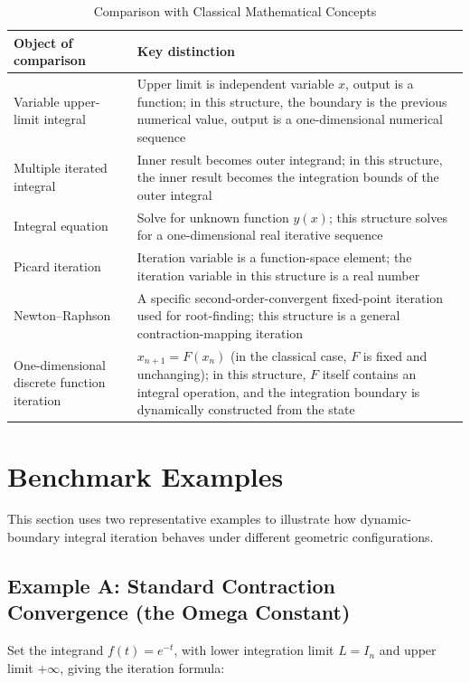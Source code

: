 \documentclass[11pt,a4paper]{amsart}
\begin{document}
\begin{table}[htbp]
\centering
\caption{Comparison with Classical Mathematical Concepts}
\begin{tabularx}{\linewidth}{@{}lX@{}}
\toprule
\textbf{Object of comparison} & \textbf{Key distinction} \\
\midrule
Variable upper-limit integral & Upper limit is independent variable $x$, output is a function; in this structure, the boundary is the previous numerical value, output is a one-dimensional numerical sequence \\
Multiple iterated integral & Inner result becomes outer integrand; in this structure, the inner result becomes the integration bounds of the outer integral \\
Integral equation & Solve for unknown function $y(x)$; this structure solves for a one-dimensional real iterative sequence \\
Picard iteration & Iteration variable is a function-space element; the iteration variable in this structure is a real number \\
Newton--Raphson & A specific second-order-convergent fixed-point iteration used for root-finding; this structure is a general contraction-mapping iteration \\
One-dimensional discrete function iteration & $x_{n+1}=F(x_n)$ (in the classical case, $F$ is fixed and unchanging); in this structure, $F$ itself contains an integral operation, and the integration boundary is dynamically constructed from the state \\
\bottomrule
\end{tabularx}
\end{table}

\section{Benchmark Examples}

This section uses two representative examples to illustrate how dynamic-boundary integral iteration behaves under different geometric configurations.

\subsection{Example A: Standard Contraction Convergence (the Omega Constant)}

Set the integrand $f(t)=e^{-t}$, with lower integration limit $L = I_n$ and upper limit $+\infty$, giving the iteration formula:
\end{document}
